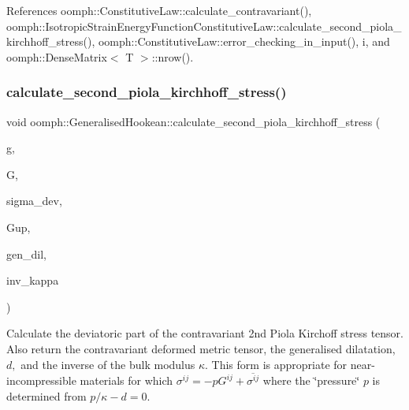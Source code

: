 References oomph\+::\+Constitutive\+Law\+::calculate\+\_\+contravariant(), oomph\+::\+Isotropic\+Strain\+Energy\+Function\+Constitutive\+Law\+::calculate\+\_\+second\+\_\+piola\+\_\+kirchhoff\+\_\+stress(), oomph\+::\+Constitutive\+Law\+::error\+\_\+checking\+\_\+in\+\_\+input(), i, and oomph\+::\+Dense\+Matrix$<$ T $>$\+::nrow().

\mbox{\label{classoomph_1_1GeneralisedHookean_ad19b5e80755f5d8e5513c4199f62fe03}} 
\subsubsection{\texorpdfstring{calculate\+\_\+second\+\_\+piola\+\_\+kirchhoff\+\_\+stress()}{calculate\_second\_piola\_kirchhoff\_stress()}\hspace{0.1cm}{\footnotesize\ttfamily [3/3]}}
{\footnotesize\ttfamily void oomph\+::\+Generalised\+Hookean\+::calculate\+\_\+second\+\_\+piola\+\_\+kirchhoff\+\_\+stress (\begin{DoxyParamCaption}\item[{const \hyperlink{classoomph_1_1DenseMatrix}{Dense\+Matrix}$<$ double $>$ \&}]{g,  }\item[{const \hyperlink{classoomph_1_1DenseMatrix}{Dense\+Matrix}$<$ double $>$ \&}]{G,  }\item[{\hyperlink{classoomph_1_1DenseMatrix}{Dense\+Matrix}$<$ double $>$ \&}]{sigma\+\_\+dev,  }\item[{\hyperlink{classoomph_1_1DenseMatrix}{Dense\+Matrix}$<$ double $>$ \&}]{Gup,  }\item[{double \&}]{gen\+\_\+dil,  }\item[{double \&}]{inv\+\_\+kappa }\end{DoxyParamCaption})\hspace{0.3cm}{\ttfamily [virtual]}}



Calculate the deviatoric part of the contravariant 2nd Piola Kirchoff stress tensor. Also return the contravariant deformed metric tensor, the generalised dilatation, $ d, $ and the inverse of the bulk modulus $ \kappa$. This form is appropriate for near-\/incompressible materials for which $ \sigma^{ij} = -p G^{ij} + \overline{ \sigma^{ij}} $ where the \char`\"{}pressure\char`\"{} $ p $ is determined from $ p / \kappa - d =0 $. 

